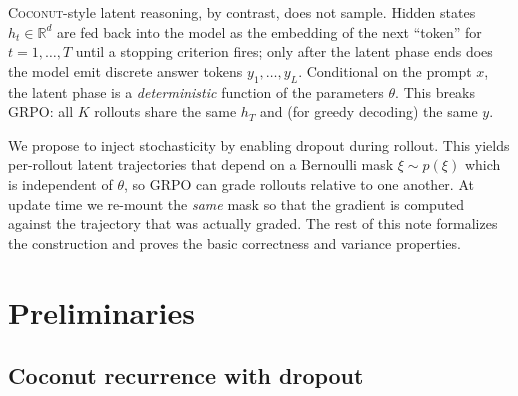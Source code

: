 \documentclass[11pt]{article}
\theoremstyle{definition}
\theoremstyle{remark}
\newcommand{\R}{\mathbb{R}}
\begin{document}
\textsc{Coconut}-style latent reasoning, by contrast, does not sample.  Hidden
states $h_t \in \R^d$ are fed back into the model as the embedding of the next
``token'' for $t = 1, \dots, T$ until a stopping criterion fires; only after
the latent phase ends does the model emit discrete answer tokens
$y_1, \dots, y_L$.  Conditional on the prompt $x$, the latent phase is a
\emph{deterministic} function of the parameters $\theta$.  This breaks GRPO:
all $K$ rollouts share the same $h_T$ and (for greedy decoding) the same $y$.

We propose to inject stochasticity by enabling dropout during rollout.  This
yields per-rollout latent trajectories that depend on a Bernoulli mask
$\xi \sim p(\xi)$ which is independent of $\theta$, so GRPO can grade rollouts
relative to one another.  At update time we re-mount the \emph{same} mask so
that the gradient is computed against the trajectory that was actually graded.
The rest of this note formalizes the construction and proves the basic
correctness and variance properties.

\section{Preliminaries}

\subsection{Coconut recurrence with dropout}
\label{sec:coconut-recurrence}
\end{document}
